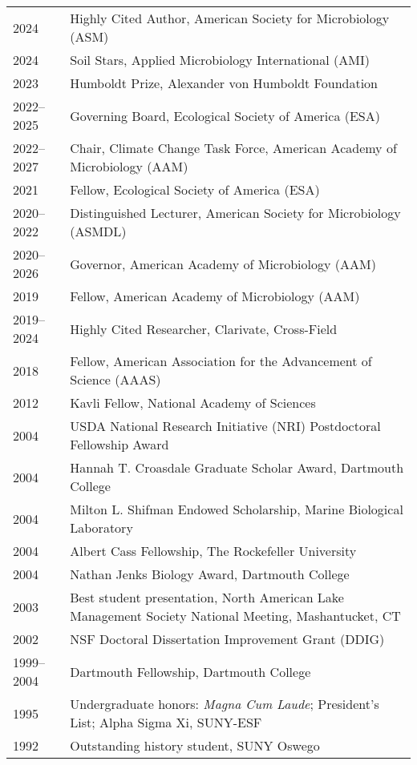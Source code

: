 \documentclass[11pt]{article}  %
\begin{document}
\begin{tabularx}{\textwidth}{@{}l@{\hspace{2em}}X@{}}
2024        & Highly Cited Author, American Society for Microbiology (ASM) \\
2024        & Soil Stars, Applied Microbiology International (AMI) \\ 
2023        & Humboldt Prize, Alexander von Humboldt Foundation \\
2022--2025  & Governing Board, Ecological Society of America (ESA) \\
2022--2027  & Chair, Climate Change Task Force, American Academy of Microbiology (AAM) \\
2021        & Fellow, Ecological Society of America (ESA) \\
2020--2022  & Distinguished Lecturer, American Society for Microbiology (ASMDL) \\
2020--2026  & Governor, American Academy of Microbiology (AAM) \\
2019        & Fellow, American Academy of Microbiology (AAM) \\
2019--2024  & Highly Cited Researcher, Clarivate, Cross-Field \\
2018        & Fellow, American Association for the Advancement of Science (AAAS) \\
2012        & Kavli Fellow, National Academy of Sciences \\
2004        & USDA National Research Initiative (NRI) Postdoctoral Fellowship Award \\
2004        & Hannah T. Croasdale Graduate Scholar Award, Dartmouth College \\
2004        & Milton L. Shifman Endowed Scholarship, Marine Biological Laboratory \\
2004        & Albert Cass Fellowship, The Rockefeller University \\
2004        & Nathan Jenks Biology Award, Dartmouth College \\
2003        & Best student presentation, North American Lake Management Society National Meeting, Mashantucket, CT \\
2002        & NSF Doctoral Dissertation Improvement Grant (DDIG) \\
1999--2004  & Dartmouth Fellowship, Dartmouth College \\
1995        & Undergraduate honors: \textit{Magna Cum Laude}; President’s List; Alpha Sigma Xi, SUNY-ESF \\
1992        & Outstanding history student, SUNY Oswego \\
\end{tabularx}
\end{document}
